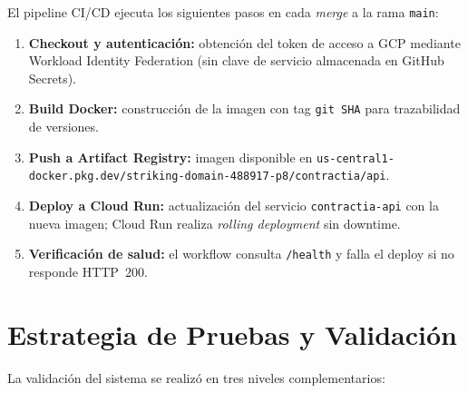 El pipeline CI/CD ejecuta los siguientes pasos en cada \textit{merge} a la
rama \texttt{main}:

\begin{enumerate}
    \item \textbf{Checkout y autenticación:} obtención del token de acceso
    a GCP mediante Workload Identity Federation (sin clave de servicio
    almacenada en GitHub Secrets).
    \item \textbf{Build Docker:} construcción de la imagen con tag
    \texttt{git SHA} para trazabilidad de versiones.
    \item \textbf{Push a Artifact Registry:} imagen disponible en
    \texttt{us-central1-docker.pkg.dev/striking-domain-488917-p8/contractia/api}.
    \item \textbf{Deploy a Cloud Run:} actualización del servicio
    \texttt{contractia-api} con la nueva imagen; Cloud Run realiza
    \textit{rolling deployment} sin downtime.
    \item \textbf{Verificación de salud:} el workflow consulta
    \texttt{/health} y falla el deploy si no responde HTTP~200.
\end{enumerate}

\section{Estrategia de Pruebas y Validación}

La validación del sistema se realizó en tres niveles complementarios:

